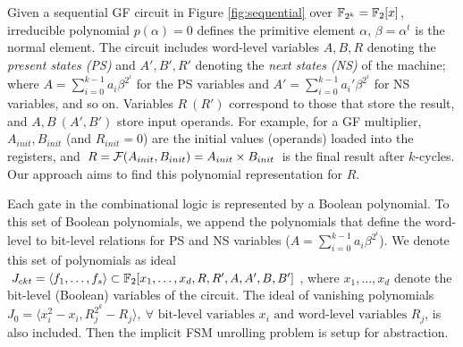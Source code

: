 \begin{figure}[bp]
\end{figure}

Given a sequential GF circuit in Figure \ref{fig:sequential} over ${\mathbb{F}}_{2^k}={\mathbb{F}}_2[x]$, irreducible polynomial $p(\alpha) = 0$
defines the primitive element $\alpha$, $\beta = \alpha^t$ is the normal element.
The circuit includes word-level variables $A, B, R$
denoting the {\it present states (PS)} and $A', B', R'$ denoting the {\it next
  states (NS)} of the machine; where $A = \sum_{i=0}^{k-1} a_i \beta^{2^i}$
for the PS variables and $A' = \sum_{i=0}^{k-1} a_i'
\beta^{2^i}$ for NS variables, and so on.  Variables $R\ (R')$ correspond to those that 
store the result, and $A, B\ (A', B')$ store input operands. For example,
for a GF multiplier, $A_{init}, B_{init}$ (and $R_{init} =
0$) are the initial values (operands) loaded into the registers,  and
$R = {\mathcal{F}}(A_{init}, B_{init}) = A_{init} \times B_{init}$ is the final
result after $k$-cycles. Our approach aims to find this polynomial
representation for $R$.  

Each gate in the combinational logic is represented by a Boolean
polynomial. To 
this set of Boolean polynomials, we append the polynomials that define
the word-level to bit-level relations for PS and NS variables ($A =
\sum_{i=0}^{k-1} a_i \beta^{2^i}$). We denote this set of polynomials
as ideal $J_{ckt} = \langle 
f_1, \dots, f_s \rangle \subset {\mathbb{F}}_2[x_1, \dots, x_d, R, R', A, A', B,
  B']$, where $x_1, \dots, x_d$ denote the bit-level (Boolean) variables
  of the circuit. The ideal of vanishing polynomials 
$J_0 = \langle x_i^2-x_i,R_j^{2^k}-R_j\rangle,~\forall \text{ bit-level variables }x_i\text{ and word-level variables }R_j$, is also included. 
Then the implicit FSM unrolling problem is setup for abstraction. 

